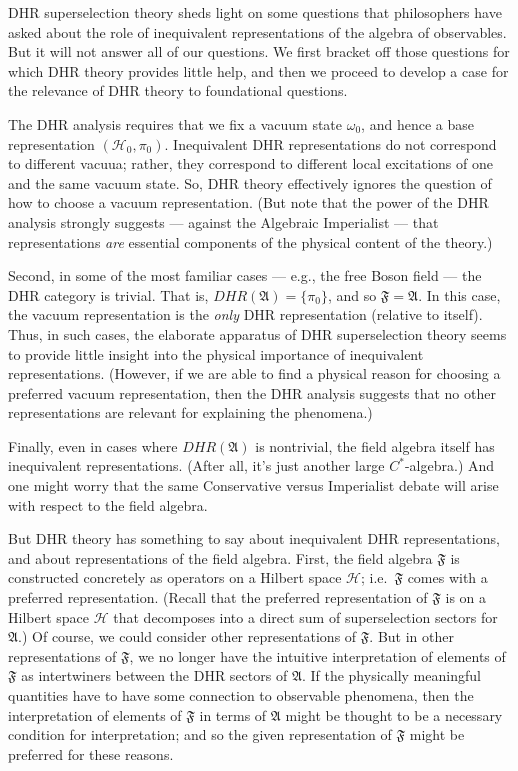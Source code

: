 \documentclass[12pt]{article}
\theoremstyle{definition}
\theoremstyle{definition}
\theoremstyle{remark}
\def\2#1{{\mathcal #1}}
\def\al#1{{\mathfrak #1}}
\def\om{\omega} \def\Om{\Omega} \def\dd{\partial} \def\D{\Delta}
\begin{document}
DHR superselection theory sheds light on some questions that
philosophers have asked about the role of inequivalent representations
of the algebra of observables.  But it will not answer all of our
questions.  We first bracket off those questions for which DHR theory
provides little help, and then we proceed to develop a case for the
relevance of DHR theory to foundational questions.

The DHR analysis requires that we fix a vacuum state $\om _0$, and
hence a base representation $(\2H_0 ,\pi _0)$.  Inequivalent DHR
representations do not correspond to different vacuua; rather, they
correspond to different local excitations of one and the same vacuum
state.  So, DHR theory effectively ignores the question of how to
choose a vacuum representation.  (But note that the power of the DHR
analysis strongly suggests --- against the Algebraic Imperialist ---
that representations \emph{are} essential components of the physical
content of the theory.)

Second, in some of the most familiar cases --- e.g., the free Boson
field --- the DHR category is trivial.  That is, $DHR(\al A)=\{ \pi _0
\}$, and so $\al F=\al A$.  In this case, the vacuum representation is
the \emph{only} DHR representation (relative to itself).  Thus, in
such cases, the elaborate apparatus of DHR superselection theory seems
to provide little insight into the physical importance of inequivalent
representations.  (However, if we are able to find a physical reason
for choosing a preferred vacuum representation, then the DHR analysis
suggests that no other representations are relevant for explaining the
phenomena.)

Finally, even in cases where $DHR(\al A)$ is nontrivial, the field
algebra itself has inequivalent representations.  (After all, it's
just another large $C^*$-algebra.)  And one might worry that the same
Conservative versus Imperialist debate will arise with respect to the
field algebra.  

But DHR theory has something to say about inequivalent DHR
representations, and about representations of the field algebra.
First, the field algebra $\al F$ is constructed concretely as
operators on a Hilbert space $\2H$; i.e.\ $\al F$ comes with a
preferred representation.  (Recall that the preferred representation
of $\al F$ is on a Hilbert space $\2H$ that decomposes into a direct
sum of superselection sectors for $\al A$.)  Of course, we could
consider other representations of $\al F$.  But in other
representations of $\al F$, we no longer have the intuitive
interpretation of elements of $\al F$ as intertwiners between the DHR
sectors of $\al A$.  If the physically meaningful quantities have to
have some connection to observable phenomena, then the interpretation
of elements of $\al F$ in terms of $\al A$ might be thought to be a
necessary condition for interpretation; and so the given
representation of $\al F$ might be preferred for these reasons.
\end{document}
